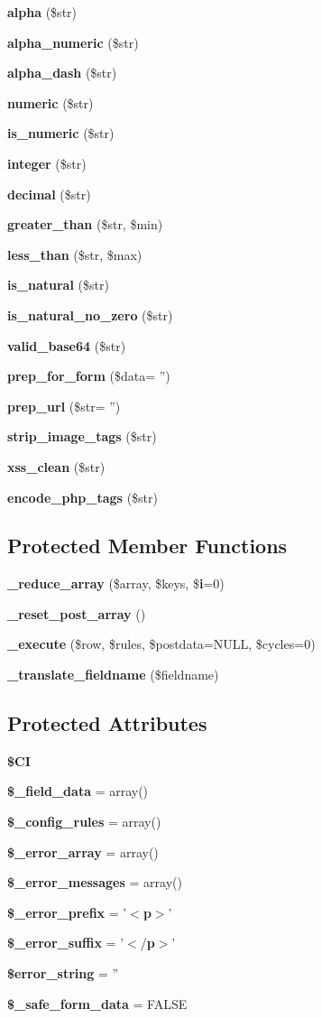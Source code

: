 \begin{DoxyCompactItemize}
{\bf alpha} (\$str)
\item 
{\bf alpha\-\_\-numeric} (\$str)
\item 
{\bf alpha\-\_\-dash} (\$str)
\item 
{\bf numeric} (\$str)
\item 
{\bf is\-\_\-numeric} (\$str)
\item 
{\bf integer} (\$str)
\item 
{\bf decimal} (\$str)
\item 
{\bf greater\-\_\-than} (\$str, \$min)
\item 
{\bf less\-\_\-than} (\$str, \$max)
\item 
{\bf is\-\_\-natural} (\$str)
\item 
{\bf is\-\_\-natural\-\_\-no\-\_\-zero} (\$str)
\item 
{\bf valid\-\_\-base64} (\$str)
\item 
{\bf prep\-\_\-for\-\_\-form} (\$data= '')
\item 
{\bf prep\-\_\-url} (\$str= '')
\item 
{\bf strip\-\_\-image\-\_\-tags} (\$str)
\item 
{\bf xss\-\_\-clean} (\$str)
\item 
{\bf encode\-\_\-php\-\_\-tags} (\$str)
\end{DoxyCompactItemize}
\subsection*{Protected Member Functions}
\begin{DoxyCompactItemize}
\item 
{\bf \-\_\-reduce\-\_\-array} (\$array, \$keys, \${\bf i}=0)
\item 
{\bf \-\_\-reset\-\_\-post\-\_\-array} ()
\item 
{\bf \-\_\-execute} (\$row, \$rules, \$postdata=N\-U\-L\-L, \$cycles=0)
\item 
{\bf \-\_\-translate\-\_\-fieldname} (\$fieldname)
\end{DoxyCompactItemize}
\subsection*{Protected Attributes}
\begin{DoxyCompactItemize}
\item 
{\bf \$\-C\-I}
\item 
{\bf \$\-\_\-field\-\_\-data} = array()
\item 
{\bf \$\-\_\-config\-\_\-rules} = array()
\item 
{\bf \$\-\_\-error\-\_\-array} = array()
\item 
{\bf \$\-\_\-error\-\_\-messages} = array()
\item 
{\bf \$\-\_\-error\-\_\-prefix} = '$<${\bf p}$>$'
\item 
{\bf \$\-\_\-error\-\_\-suffix} = '$<$/{\bf p}$>$'
\item 
{\bf \$error\-\_\-string} = ''
\item 
{\bf \$\-\_\-safe\-\_\-form\-\_\-data} = F\-A\-L\-S\-E
\end{DoxyCompactItemize}


